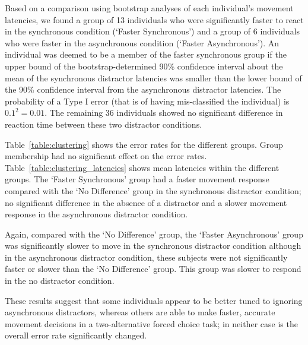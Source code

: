 Based on a comparison using bootstrap analyses of each individual's
movement latencies, we found a group of 13 individuals who were
significantly faster to react in the synchronous condition (`Faster
Synchronous') and a group of 6 individuals who were faster in the
asynchronous condition (`Faster Asynchronous'). An individual was
deemed to be a member of the faster synchronous group if the upper
bound of the bootstrap-determined 90\% confidence interval about the
mean of the synchronous distractor latencies was smaller than the
lower bound of the 90\% confidence interval from the asynchronous
distractor latencies. The probability of a Type I error (that is of
having mis-classified the individual) is $0.1^2 = 0.01$. The remaining
36 individuals showed no significant difference in reaction time
between these two distractor conditions.

Table~\ref{table:clustering} shows the error rates for the different
groups. Group membership had no significant effect on the error
rates. Table~\ref{table:clustering_latencies} shows mean latencies
within the different groups. The `Faster Synchronous' group had a
faster movement response compared with the `No Difference' group in
the synchronous distractor condition; no significant difference in the
absence of a distractor and a slower movement response in the
asynchronous distractor condition.

Again, compared with the `No Difference' group, the `Faster
Asynchronous' group was significantly slower to move in the synchronous
distractor condition although in the asynchronous distractor
condition, these subjects were not significantly faster or slower than
the `No Difference' group. This group was slower to respond in the
no distractor condition.

These results suggest that some individuals appear to be better tuned
to ignoring asynchronous distractors, whereas others are able to make
faster, accurate movement decisions in a two-alternative forced choice
task; in neither case is the overall error rate significantly changed.


